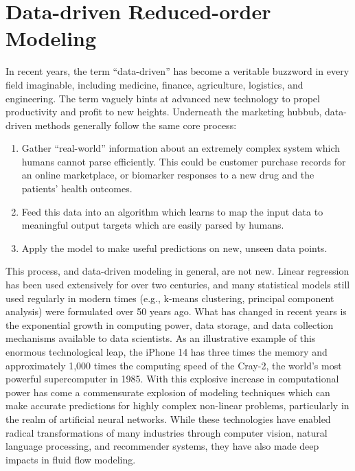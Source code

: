 \section{Data-driven Reduced-order Modeling}

In recent years, the term ``data-driven'' has become a veritable buzzword in every field imaginable, including medicine, finance, agriculture, logistics, and engineering. The term vaguely hints at advanced new technology to propel productivity and profit to new heights. Underneath the marketing hubbub, data-driven methods generally follow the same core process:

\begin{enumerate}
    \item Gather ``real-world'' information about an extremely complex system which humans cannot parse efficiently. This could be customer purchase records for an online marketplace, or biomarker responses to a new drug and the patients' health outcomes.
    \item Feed this data into an algorithm which learns to map the input data to meaningful output targets which are easily parsed by humans.
    \item Apply the model to make useful predictions on new, unseen data points.
\end{enumerate}

This process, and data-driven modeling in general, are not new. Linear regression has been used extensively for over two centuries, and many statistical models still used regularly in modern times (e.g., k-means clustering, principal component analysis) were formulated over 50 years ago. What has changed in recent years is the exponential growth in computing power, data storage, and data collection mechanisms available to data scientists. As an illustrative example of this enormous technological leap, the iPhone 14 has three times the memory and approximately 1,000 times the computing speed of the Cray-2, the world's most powerful supercomputer in 1985. With this explosive increase in computational power has come a commensurate explosion of modeling techniques which can make accurate predictions for highly complex non-linear problems, particularly in the realm of artificial neural networks. While these technologies have enabled radical transformations of many industries through computer vision, natural language processing, and recommender systems, they have also made deep impacts in fluid flow modeling.

